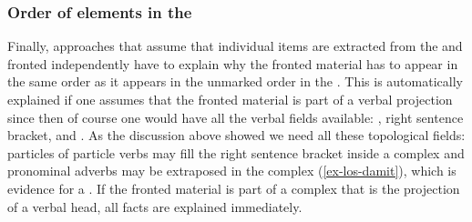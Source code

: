 

\subsubsection{Order of elements in the \vf}

Finally, approaches that assume that individual items are extracted from the \mf and fronted
independently have to explain why the fronted material has to appear in the same order as it appears
in the unmarked order in the \mf. This is automatically explained if one assumes that the fronted
material is part of a verbal projection since then of course one would have all the verbal fields
available: \mf, right sentence bracket, and \nf. As the discussion above showed we need all these
topological fields: particles of particle verbs may fill the right sentence bracket inside a complex
\vf and pronominal adverbs may be extraposed in the complex \vf (\ref{ex-los-damit}), which is
evidence for a \nf. If the fronted material is part of a complex \vf that is the projection of a
verbal head, all facts are explained immediately.

